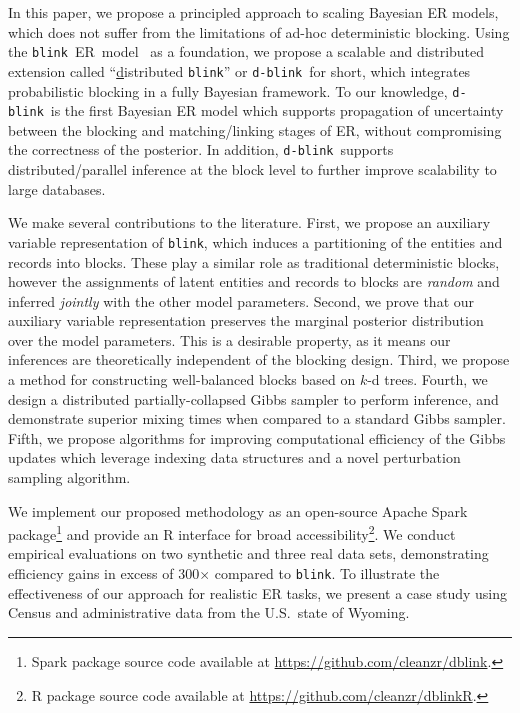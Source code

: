 \documentclass[12pt,letterpaper]{article}
\newcommand{\1}[1]{\mathbb{I}\!\left[#1\right]} %
\newcommand{\dblink}{\texttt{\upshape \lowercase{d-blink}}} %
\newcommand{\blink}{\texttt{\upshape \lowercase{blink}}} %
\begin{document}
In this paper, we propose a principled approach to scaling Bayesian ER 
models, which does not suffer from the limitations of ad-hoc 
deterministic blocking. 
Using the \blink\ ER~model~\citep{steorts_entity_2015} as a 
foundation, we propose a scalable and distributed extension called 
``\underline{d}istributed \blink'' or \dblink\ for short, which 
integrates probabilistic blocking in a fully Bayesian framework. 
To our knowledge, \dblink\ is the first Bayesian ER model which 
supports propagation of uncertainty between the blocking and 
matching\slash linking stages of ER, without compromising the 
correctness of the posterior. 
In addition, \dblink\ supports distributed\slash parallel inference 
at the block level to further improve scalability to large databases.

We make several contributions to the literature. 
First, we propose an auxiliary variable representation of \blink, 
which induces a partitioning of the entities and records into blocks. 
These play a similar role as traditional deterministic blocks, 
however the assignments of latent entities and records to blocks are 
\emph{random} and inferred \emph{jointly} with the other model 
parameters. 
Second, we prove that our auxiliary variable representation 
preserves the marginal posterior distribution over the model 
parameters. 
This is a desirable property, as it means our inferences are 
theoretically independent of the blocking design. 
Third, we propose a method for constructing well-balanced blocks based 
on $k$-d trees. 
Fourth, we design a distributed partially-collapsed Gibbs sampler to perform 
inference, and demonstrate superior mixing times when compared to a standard 
Gibbs sampler. 
Fifth, we propose algorithms for improving computational efficiency 
of the Gibbs updates which leverage indexing data structures and a 
novel perturbation sampling algorithm. 

We implement our proposed methodology as an open-source Apache Spark 
package\footnote{Spark package source code available at 
  \url{https://github.com/cleanzr/dblink}.}
and provide an R interface for broad accessibility\footnote{R package 
  source code available at \url{https://github.com/cleanzr/dblinkR}.}. 
We conduct empirical evaluations on two synthetic and three real data sets, 
demonstrating efficiency gains in excess of 300$\times$ compared to 
\blink. 
To illustrate the effectiveness of our approach for realistic ER tasks, 
we present a case study using Census and administrative data from the 
U.S.\ state of Wyoming.
\end{document}
